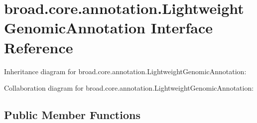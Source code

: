 \hypertarget{interfacebroad_1_1core_1_1annotation_1_1_lightweight_genomic_annotation}{\section{broad.\+core.\+annotation.\+Lightweight\+Genomic\+Annotation Interface Reference}
\label{interfacebroad_1_1core_1_1annotation_1_1_lightweight_genomic_annotation}
}


Inheritance diagram for broad.\+core.\+annotation.\+Lightweight\+Genomic\+Annotation\+:


Collaboration diagram for broad.\+core.\+annotation.\+Lightweight\+Genomic\+Annotation\+:
\subsection*{Public Member Functions}
